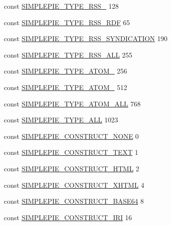 \begin{DoxyCompactItemize}
\item 
const \hyperlink{simplepie_8inc_ae39c46f11a574e880fee23fa974699ca}{S\-I\-M\-P\-L\-E\-P\-I\-E\-\_\-\-T\-Y\-P\-E\-\_\-\-R\-S\-S\-\_} 128
\item 
const \hyperlink{simplepie_8inc_a607f9ad10afe52936b666c49860c76f3}{S\-I\-M\-P\-L\-E\-P\-I\-E\-\_\-\-T\-Y\-P\-E\-\_\-\-R\-S\-S\-\_\-\-R\-D\-F} 65
\item 
const \hyperlink{simplepie_8inc_adb6c8895db852aef6c77a959cce176fa}{S\-I\-M\-P\-L\-E\-P\-I\-E\-\_\-\-T\-Y\-P\-E\-\_\-\-R\-S\-S\-\_\-\-S\-Y\-N\-D\-I\-C\-A\-T\-I\-O\-N} 190
\item 
const \hyperlink{simplepie_8inc_a4b9d8b61fafa46566cdaa486b4587c40}{S\-I\-M\-P\-L\-E\-P\-I\-E\-\_\-\-T\-Y\-P\-E\-\_\-\-R\-S\-S\-\_\-\-A\-L\-L} 255
\item 
const \hyperlink{simplepie_8inc_a7bb49b4c097ff7beb9db034847eda613}{S\-I\-M\-P\-L\-E\-P\-I\-E\-\_\-\-T\-Y\-P\-E\-\_\-\-A\-T\-O\-M\-\_} 256
\item 
const \hyperlink{simplepie_8inc_a94ef8488ab54234e60d2ba79485e3f73}{S\-I\-M\-P\-L\-E\-P\-I\-E\-\_\-\-T\-Y\-P\-E\-\_\-\-A\-T\-O\-M\-\_} 512
\item 
const \hyperlink{simplepie_8inc_ac317fe94790c4ac5a5a554440d68822e}{S\-I\-M\-P\-L\-E\-P\-I\-E\-\_\-\-T\-Y\-P\-E\-\_\-\-A\-T\-O\-M\-\_\-\-A\-L\-L} 768
\item 
const \hyperlink{simplepie_8inc_ac041c53630348f9b4e243f45a6bcc7a4}{S\-I\-M\-P\-L\-E\-P\-I\-E\-\_\-\-T\-Y\-P\-E\-\_\-\-A\-L\-L} 1023
\item 
const \hyperlink{simplepie_8inc_adf772a91641976a8e9b10bc30af98eb2}{S\-I\-M\-P\-L\-E\-P\-I\-E\-\_\-\-C\-O\-N\-S\-T\-R\-U\-C\-T\-\_\-\-N\-O\-N\-E} 0
\item 
const \hyperlink{simplepie_8inc_a32f1cee47ad770a8f7e7fa969c2ff9cf}{S\-I\-M\-P\-L\-E\-P\-I\-E\-\_\-\-C\-O\-N\-S\-T\-R\-U\-C\-T\-\_\-\-T\-E\-X\-T} 1
\item 
const \hyperlink{simplepie_8inc_a048873611857d2ea59c6df624f25bba7}{S\-I\-M\-P\-L\-E\-P\-I\-E\-\_\-\-C\-O\-N\-S\-T\-R\-U\-C\-T\-\_\-\-H\-T\-M\-L} 2
\item 
const \hyperlink{simplepie_8inc_a356175e32fcf1365abbb8bf48a7e8ff7}{S\-I\-M\-P\-L\-E\-P\-I\-E\-\_\-\-C\-O\-N\-S\-T\-R\-U\-C\-T\-\_\-\-X\-H\-T\-M\-L} 4
\item 
const \hyperlink{simplepie_8inc_a181a215206b345e72b6cfa0be7e8eaab}{S\-I\-M\-P\-L\-E\-P\-I\-E\-\_\-\-C\-O\-N\-S\-T\-R\-U\-C\-T\-\_\-\-B\-A\-S\-E64} 8
\item 
const \hyperlink{simplepie_8inc_a27b953d4a1dddffc8f6db2585c2b8fe0}{S\-I\-M\-P\-L\-E\-P\-I\-E\-\_\-\-C\-O\-N\-S\-T\-R\-U\-C\-T\-\_\-\-I\-R\-I} 16

\end{DoxyCompactItemize}
